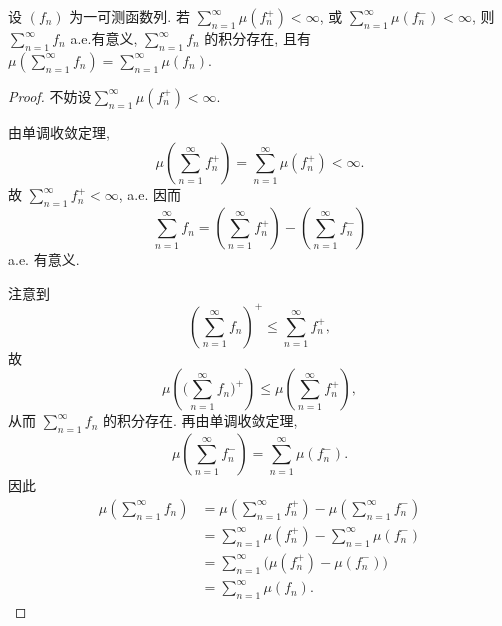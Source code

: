         \begin{3}
            设 $(f_n)$ 为一可测函数列. 
            若 $\displaystyle\sum_{n=1}^\infty \mu(f_n^+)<\infty$, 
            或 $\displaystyle\sum_{n=1}^\infty \mu(f_n^-)<\infty$, 
            则 $\displaystyle\sum_{n=1}^\infty f_n$ a.e.有意义, 
            $\displaystyle\sum_{n=1}^\infty f_n$ 的积分存在, 
            且有 $\displaystyle\mu\left(\sum_{n=1}^\infty f_n\right)=\sum_{n=1}^\infty \mu(f_n)$.
        \end{3}
        \begin{proof}
            不妨设$\displaystyle\sum_{n=1}^{\infty}\mu(f_n^+)<\infty$.

            由单调收敛定理,
            \[
                \mu\left(\sum_{n=1}^\infty f_n^+\right)=\sum_{n=1}^{\infty}\mu(f_n^+)<\infty.
            \]
            故 $\displaystyle\sum_{n=1}^\infty f_n^+<\infty$, a.e. 因而
            \[
                \sum_{n=1}^{\infty}f_n=\left(\sum_{n=1}^\infty f_n^+\right)-\left(\sum_{n=1}^\infty f_n^-\right)
            \]
            a.e. 有意义.

            注意到
            \[
                \left(\sum_{n=1}^\infty f_n\right)^+\leqslant \sum_{n=1}^\infty f_n^+, 
            \]
            故
            \[
                \displaystyle\mu\left(\biggl(\sum_{n=1}^\infty f_n\biggr)^+\right)\leqslant \mu\left(\sum_{n=1}^\infty f_n^+\right), 
            \]
            从而 $\displaystyle\sum_{n=1}^\infty f_n$ 的积分存在. 再由单调收敛定理,
            \[
                \mu\left(\sum_{n=1}^\infty f_n^-\right)
                =\sum_{n=1}^{\infty}\mu(f_n^-).
            \]
            因此
            \[
                \begin{aligned}
                    \mu\left(\sum_{n=1}^{\infty}f_n\right)
                    &=\mu\left(\sum_{n=1}^\infty f_n^+\right)-\mu\left(\sum_{n=1}^\infty f_n^-\right)\\
                    &=\sum_{n=1}^{\infty}\mu(f_n^+)
                    -\sum_{n=1}^{\infty}\mu(f_n^-)\\
                    &=\sum_{n=1}^{\infty}
                    \bigl(\mu(f_n^+)-\mu(f_n^-)\bigr)\\
                    &=\sum_{n=1}^{\infty}\mu(f_n).
                \end{aligned}
            \]
        \end{proof}